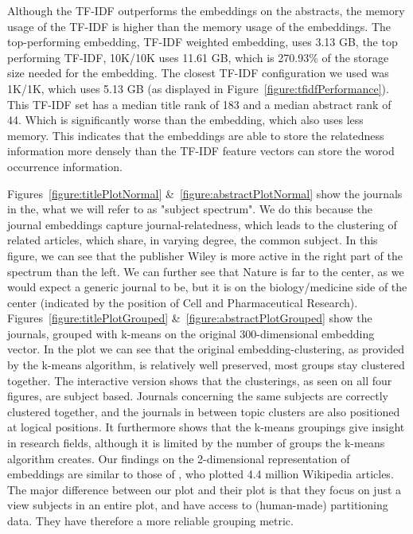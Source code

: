 \documentclass[../../Thesis.tex]{subfiles}
\begin{document}
Although the TF-IDF outperforms the embeddings on the abstracts, the memory usage of the TF-IDF is higher than the memory usage of the embeddings. The top-performing embedding, TF-IDF weighted embedding, uses 3.13 GB, the top performing TF-IDF, 10K/10K uses 11.61 GB, which is 270.93\% of the storage size needed for the embedding. The closest TF-IDF configuration we used was 1K/1K, which uses 5.13 GB (as displayed in Figure~\ref{figure:tfidfPerformance}). This TF-IDF set has a median title rank of 183 and a median abstract rank of 44. Which is significantly worse than the embedding, which also uses less memory. This indicates that the embeddings are able to store the relatedness information more densely than the TF-IDF feature vectors can store the worod occurrence information.

Figures~\ref{figure:titlePlotNormal} \&~\ref{figure:abstractPlotNormal} show the journals in the, what we will refer to as "subject spectrum". We do this because the journal embeddings capture journal-relatedness, which leads to the clustering of related articles, which share, in varying degree, the common subject. In this figure, we can see that the publisher Wiley is more active in the right part of the spectrum than the left. We can further see that Nature is far to the center, as we would expect a generic journal to be, but it is on the biology/medicine side of the center (indicated by the position of Cell and Pharmaceutical Research).\\
Figures~\ref{figure:titlePlotGrouped} \&~\ref{figure:abstractPlotGrouped} show the journals, grouped with k-means on the original 300-dimensional embedding vector. In the plot we can see that the original embedding-clustering, as provided by the k-means algorithm, is relatively well preserved, most groups stay clustered together. 
The interactive version shows that the clusterings, as seen on all four figures, are subject based. Journals concerning the same subjects are correctly clustered together, and the journals in between topic clusters are also positioned at logical positions. It furthermore shows that the k-means groupings give insight in research fields, although it is limited by the number of groups the k-means algorithm creates. Our findings on the 2-dimensional representation of embeddings are similar to those of \citet{dai2015document}, who plotted 4.4 million Wikipedia articles. The major difference between our plot and their plot is that they focus on just a view subjects in an entire plot, and have access to (human-made) partitioning data. They have therefore a more reliable grouping metric.
\end{document}
